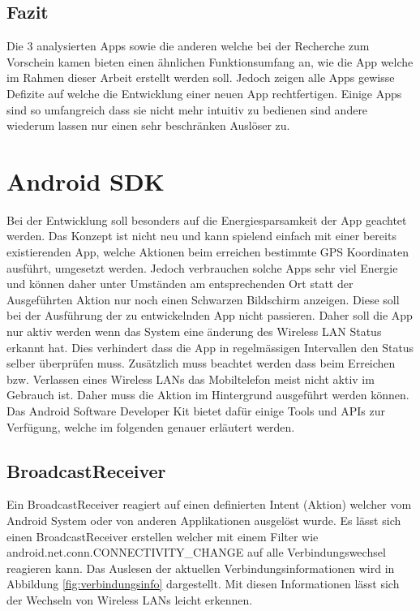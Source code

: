 \subsection{Fazit}
Die 3 analysierten Apps sowie die anderen welche bei der Recherche zum Vorschein kamen bieten einen ähnlichen Funktionsumfang an, wie die App welche im Rahmen dieser Arbeit erstellt werden soll. Jedoch zeigen alle Apps gewisse Defizite auf welche die Entwicklung einer neuen App rechtfertigen. Einige Apps sind so umfangreich dass sie nicht mehr intuitiv zu bedienen sind andere wiederum lassen nur einen sehr beschränken Auslöser zu.


\section{Android SDK}
Bei der Entwicklung soll besonders auf die Energiesparsamkeit der App geachtet werden. Das Konzept ist nicht neu und kann spielend einfach mit einer bereits existierenden App, welche Aktionen beim erreichen bestimmte GPS Koordinaten ausführt, umgesetzt werden. Jedoch verbrauchen solche Apps sehr viel Energie und können daher unter Umständen am entsprechenden Ort statt der Ausgeführten Aktion nur noch einen Schwarzen Bildschirm anzeigen. Diese soll bei der Ausführung der zu entwickelnden App nicht passieren. Daher soll die App nur aktiv werden wenn das System eine änderung des Wireless LAN Status erkannt hat. Dies verhindert dass die App in regelmässigen Intervallen den Status selber überprüfen muss. Zusätzlich muss beachtet werden dass beim Erreichen bzw. Verlassen eines Wireless LANs das Mobiltelefon meist nicht aktiv im Gebrauch ist. Daher muss die Aktion im Hintergrund ausgeführt werden können. Das Android Software Developer Kit bietet dafür einige Tools und APIs zur Verfügung, welche im folgenden genauer erläutert werden.

\subsection{BroadcastReceiver}
Ein BroadcastReceiver reagiert auf einen definierten Intent (Aktion) welcher vom Android System oder von anderen Applikationen ausgelöst wurde. Es lässt sich einen BroadcastReceiver erstellen welcher mit einem Filter wie \glqq android.net.conn.CONNECTIVITY\_CHANGE\grqq{} auf alle Verbindungswechsel reagieren kann. Das Auslesen der aktuellen Verbindungsinformationen wird in Abbildung \ref{fig:verbindungsinfo} dargestellt. Mit diesen Informationen lässt sich der Wechseln von Wireless LANs leicht erkennen.

